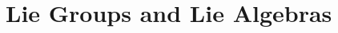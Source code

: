 \documentclass[../main]{subfiles}
\begin{document}
\chapter{Lie Groups and Lie Algebras}
\end{document}
